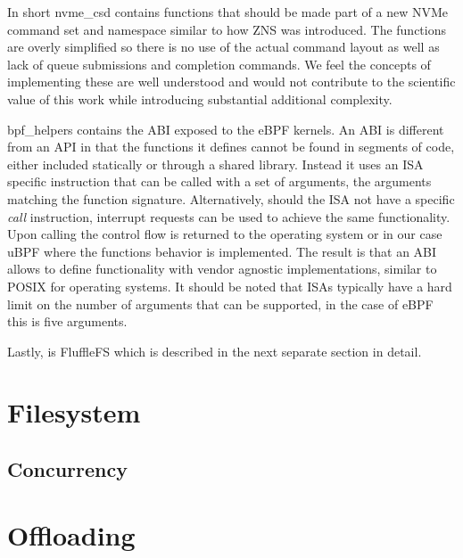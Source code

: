 In short nvme\_csd contains functions that should be made part of a new NVMe
command set and namespace \cite{nvme-command} similar to how ZNS was introduced.
The functions are overly simplified so there is no use of the actual command
layout as well as lack of queue submissions and completion commands. We feel
the concepts of implementing these are well understood and would not contribute
to the scientific value of this work while introducing substantial additional
complexity.

bpf\_helpers contains the ABI exposed to the eBPF kernels. An ABI is different
from an API in that the functions it defines cannot be found in segments of
code, either included statically or through a shared library. Instead it uses
an ISA specific instruction that can be called with a set of arguments, the
arguments matching the function signature. Alternatively, should the ISA not
have a specific \textit{call} instruction, interrupt requests can be used to
achieve the same functionality. Upon calling the control flow is returned to
the operating system or in our case uBPF where the functions behavior is
implemented. The result is that an ABI allows to define functionality with
vendor agnostic implementations, similar to POSIX for operating systems. It
should be noted that ISAs typically have a hard limit on the number of arguments
that can be supported, in the case of eBPF this is five arguments.

Lastly, is FluffleFS which is described in the next separate section in detail.

\section{Filesystem}


\subsection{Concurrency}

\section{Offloading}


